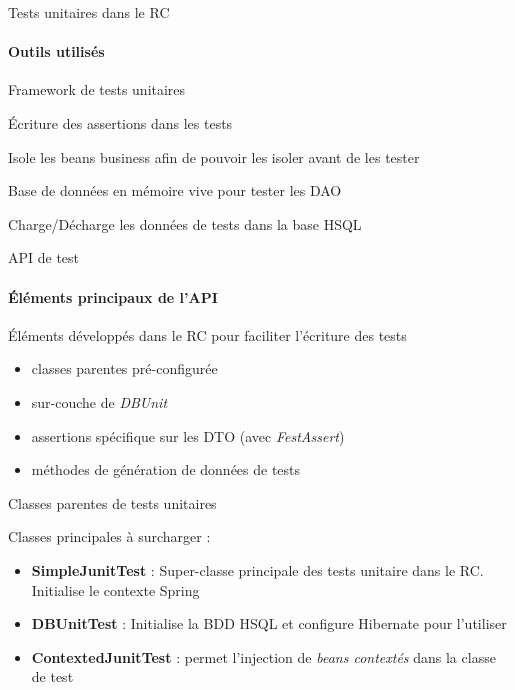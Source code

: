 \documentclass[compact]{beamer}%
\begin{document}
\begin{frame}{Tests unitaires dans le RC}
	\framesubtitle{Outils utilisés}
	
	\begin{description}[<+->]
	\item[JUNIT] Framework de tests unitaires
	\item[FestAssert] Écriture des assertions dans les tests
	\item[Mockito] Isole les beans business afin de pouvoir les isoler avant de les tester
	\item[HSQL] Base de données en mémoire vive pour tester les DAO
	\item[DBUnit] Charge/Décharge les données de tests dans la base HSQL
	\end{description}

\end{frame}

\begin{frame}{API de test}
	\framesubtitle{Éléments principaux de l'API}

	Éléments développés dans le RC pour faciliter l'écriture des tests
	\begin{itemize}[<+->]
	\item classes parentes pré-configurée
	\item sur-couche de \emph{DBUnit}
	\item assertions spécifique sur les DTO (avec \emph{FestAssert})
	\item méthodes de génération de données de tests
	\end{itemize}
\end{frame}

\begin{frame}{Classes parentes de tests unitaires}

	Classes principales à surcharger :
	\begin{itemize}[<+->]
	\item \textbf{SimpleJunitTest} : Super-classe principale des tests unitaire dans le RC. Initialise le contexte Spring
	\item \textbf{DBUnitTest} : Initialise la BDD HSQL et configure Hibernate pour l'utiliser
	\item \textbf{ContextedJunitTest} : permet l'injection de \emph{beans contextés} dans la classe de test
	\end{itemize}
\end{frame}
\end{document}
